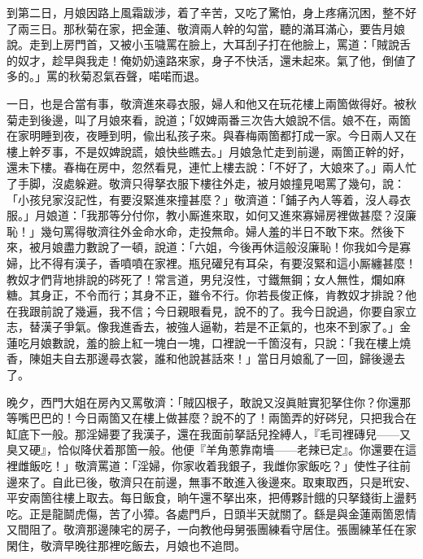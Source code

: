到第二日，月娘因路上風霜跋涉，着了辛苦，又吃了驚怕，身上疼痛沉困，整不好了兩三日。那秋菊在家，把金蓮、敬濟兩人幹的勾當，聽的滿耳滿心，要告月娘說。走到上房門首，又被小玉噦罵在臉上，大耳刮子打在他臉上，罵道：「賊說舌的奴才，趁早與我走！俺奶奶遠路來家，身子不快活，還未起來。氣了他，倒値了多的。」罵的秋菊忍氣吞聲，喏喏而退。

一日，也是合當有事，敬濟進來尋衣服，婦人和他又在玩花樓上兩箇做得好。被秋菊走到後邊，叫了月娘來看，說道；「奴婢兩番三次告大娘說不信。娘不在，兩箇在家明睡到夜，夜睡到明，偸出私孩子來。與春梅兩箇都打成一家。今日兩人又在樓上幹歹事，不是奴婢說謊，娘快些瞧去。」月娘急忙走到前邊，兩箇正幹的好，還未下樓。春梅在房中，忽然看見，連忙上樓去說：「不好了，大娘來了。」兩人忙了手脚，沒處躲避。敬濟只得拏衣服下樓往外走，被月娘撞見喝罵了幾句，說：「小孩兒家沒記性，有要沒緊進來撞甚麼？」敬濟道：「鋪子內人等着，沒人尋衣服。」月娘道：「我那等分付你，教小厮進來取，如何又進來寡婦房裡做甚麼？沒廉恥！」幾句罵得敬濟往外金命水命，走投無命。婦人羞的半日不敢下來。{}然後下來，被月娘盡力數說了一頓，說道：「六姐，今後再休這般沒廉恥！你我如今是寡婦，比不得有漢子，香噴噴在家裡。瓶兒礶兒有耳朵，有要沒緊和這小厮纏甚麼！教奴才們背地排說的硶死了！常言道，男兒沒性，寸鐵無鋼；女人無性，爛如麻糖。其身正，不令而行；其身不正，雖令不行。你若長俊正條，肯教奴才排說？他在我跟前說了幾遍，我不信；今日親眼看見，說不的了。我今日說過，你要自家立志，替漢子爭氣。像我進香去，被強人逼勒，若是不正氣的，也來不到家了。」{}金蓮吃月娘數說，羞的臉上紅一塊白一塊，口裡說一千箇沒有，只說：「我在樓上燒香，陳姐夫自去那邊尋衣裳，誰和他說甚話來！」{}當日月娘亂了一回，歸後邊去了。

晚夕，西門大姐在房內又罵敬濟：「賊囚根子，敢說又沒眞賍實犯拏住你？你還那等嘴巴巴的！今日兩箇又在樓上做甚麼？說不的了！兩箇弄的好硶兒，只把我合在缸底下一般。那淫婦要了我漢子，還在我面前拏話兒拴縛人，『毛司裡磚兒——又臭又硬』，{}恰似降伏着那箇一般。他便『羊角蔥靠南墻——老辣已定』。你還要在這裡雌飯吃！」敬濟罵道：「淫婦，你家收着我銀子，我雌你家飯吃？」使性子往前邊來了。{}自此已後，敬濟只在前邊，無事不敢進入後邊來。取東取西，只是玳安、平安兩箇往樓上取去。每日飯食，晌午還不拏出來，把傅夥計餓的只拏錢街上盪麫吃。{}正是龍鬬虎傷，苦了小獐。各處門戶，日頭半天就關了。{}繇是與金蓮兩箇恩情又間阻了。{}敬濟那邊陳宅的房子，一向教他母舅張團練看守居住。張團練革任在家閑住，敬濟早晚往那裡吃飯去，月娘也不追問。

